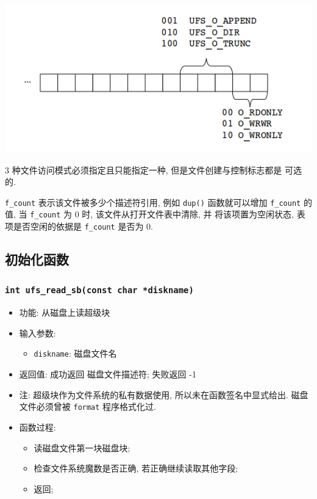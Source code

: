 \documentclass[nofonts, titlepage]{ctexart}
\begin{document}
\begin{center}
\includegraphics[width=14cm]{./images/./file_mode.png}
\label{fig:f_mode}
\end{center}

3 种文件访问模式必须指定且只能指定一种, 但是文件创建与控制标志都是
可选的.

\texttt{f\_count} 表示该文件被多少个描述符引用, 例如 \texttt{dup()}
函数就可以增加 \texttt{f\_count} 的值, 当 \texttt{f\_count} 为 0 时,
该文件从打开文件表中清除, 并 将该项置为空闲状态, 表项是否空闲的依据是
\texttt{f\_count} 是否为 0.

\subsection{初始化函数}
\subsubsection[\texttt{ufs\_read\_sb}]{\texttt{int ufs\_read\_sb(const char *diskname)}}
\begin{itemize}
\item
  功能: 从磁盘上读超级块
\item
  输入参数:

  \begin{itemize}
  \item
    \texttt{diskname}: 磁盘文件名
  \end{itemize}
\item
  返回值: 成功返回 磁盘文件描述符; 失败返回 -1
\item
  注: 超级块作为文件系统的私有数据使用, 所以未在函数签名中显式给出.
  磁盘文件必须曾被 \texttt{format} 程序格式化过.
\item
  函数过程:

  \begin{itemize}
  \item
    读磁盘文件第一块磁盘块;
  \item
    检查文件系统魔数是否正确, 若正确继续读取其他字段;
  \item
    返回;
  \end{itemize}
\end{itemize}
\end{document}
